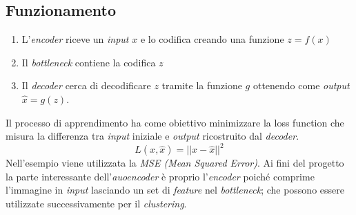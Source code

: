 \subsection{Funzionamento}
\begin{enumerate}
    \item L'\emph{encoder} riceve un \emph{input} \( x \) e lo codifica creando una funzione \( z= f(x) \)
    \item Il \emph{bottleneck} contiene la codifica \( z \)
    \item Il \emph{decoder} cerca di decodificare \( z \) tramite la funzione \( g \) ottenendo come \emph{output} \( \hat{x} = g(z) \).
\end{enumerate}
Il processo di apprendimento ha come obiettivo minimizzare la loss function che misura la differenza tra \emph{input} iniziale e \emph{output} ricostruito dal \emph{decoder}.
\[ L(x, \hat{x}) = ||x - \hat{x}||^2 \]
Nell'esempio viene utilizzata la \emph{MSE (Mean Squared Error)}.
Ai fini del progetto la parte interessante dell'\emph{auoencoder} è proprio l'\emph{encoder} poiché comprime l'immagine in \emph{input} lasciando un set di \emph{feature} nel \emph{bottleneck}; che possono essere utilizzate successivamente per il \emph{clustering}.









